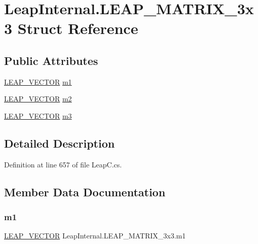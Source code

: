 \hypertarget{struct_leap_internal_1_1_l_e_a_p___m_a_t_r_i_x__3x3}{}\section{Leap\+Internal.\+L\+E\+A\+P\+\_\+\+M\+A\+T\+R\+I\+X\+\_\+3x3 Struct Reference}
\label{struct_leap_internal_1_1_l_e_a_p___m_a_t_r_i_x__3x3}
\subsection*{Public Attributes}
\begin{DoxyCompactItemize}
\item 
\mbox{\hyperlink{struct_leap_internal_1_1_l_e_a_p___v_e_c_t_o_r}{L\+E\+A\+P\+\_\+\+V\+E\+C\+T\+OR}} \mbox{\hyperlink{struct_leap_internal_1_1_l_e_a_p___m_a_t_r_i_x__3x3_ad13d3fd56bfd8278a647989fded0ae00}{m1}}
\item 
\mbox{\hyperlink{struct_leap_internal_1_1_l_e_a_p___v_e_c_t_o_r}{L\+E\+A\+P\+\_\+\+V\+E\+C\+T\+OR}} \mbox{\hyperlink{struct_leap_internal_1_1_l_e_a_p___m_a_t_r_i_x__3x3_aeb1c5fba446c394910f6a98902a92928}{m2}}
\item 
\mbox{\hyperlink{struct_leap_internal_1_1_l_e_a_p___v_e_c_t_o_r}{L\+E\+A\+P\+\_\+\+V\+E\+C\+T\+OR}} \mbox{\hyperlink{struct_leap_internal_1_1_l_e_a_p___m_a_t_r_i_x__3x3_a17a3e55f68ec73e234be358a7c2c0af8}{m3}}
\end{DoxyCompactItemize}


\subsection{Detailed Description}


Definition at line 657 of file Leap\+C.\+cs.



\subsection{Member Data Documentation}
\mbox{\label{struct_leap_internal_1_1_l_e_a_p___m_a_t_r_i_x__3x3_ad13d3fd56bfd8278a647989fded0ae00}} 
\subsubsection{\texorpdfstring{m1}{m1}}
{\footnotesize\ttfamily \mbox{\hyperlink{struct_leap_internal_1_1_l_e_a_p___v_e_c_t_o_r}{L\+E\+A\+P\+\_\+\+V\+E\+C\+T\+OR}} Leap\+Internal.\+L\+E\+A\+P\+\_\+\+M\+A\+T\+R\+I\+X\+\_\+3x3.\+m1}



